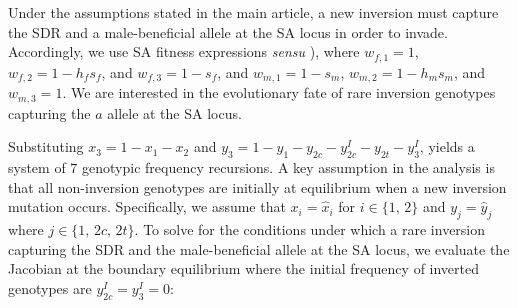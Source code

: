 \documentclass{article}
\begin{document}
Under the assumptions stated in the main article, a new inversion must capture the SDR and a male-beneficial allele at the SA locus in order to invade. Accordingly, we use SA fitness expressions {\itshape sensu} \citealt{Kidwell1977,ConnallonClark2012,Otto2011}), where $w_{f,1} = 1$, $w_{f,2} = 1 - h_f s_f$, and $w_{f,3} = 1 - s_f$, and $w_{m,1} = 1 - s_m$, $w_{m,2} = 1 - h_m s_m$, and $w_{m,3} = 1$. We are interested in the evolutionary fate of rare inversion genotypes capturing the $a$ allele at the SA locus.

Substituting $x_3 = 1 - x_1 - x_2$ and $y_3 = 1 - y_1 - y_{2c} - y^I_{2c} - y_{2t} - y^I_3$, yields a system of $7$ genotypic frequency recursions. A key assumption in the analysis is that all non-inversion genotypes are initially at equilibrium when a new inversion mutation occurs. Specifically, we assume that $x_i = \hat{x}_i$ for $i \in \{1,\,2 \}$ and $y_j = \hat{y}_j$ where $j \in \{ 1,\,2c,\,2t \}$. To solve for the conditions under which a rare inversion capturing the SDR and the male-beneficial allele at the SA locus, we evaluate the Jacobian at the boundary equilibrium where the initial frequency of inverted genotypes are $y^{I}_{2c} = y^{I}_{3} = 0$:
\end{document}
